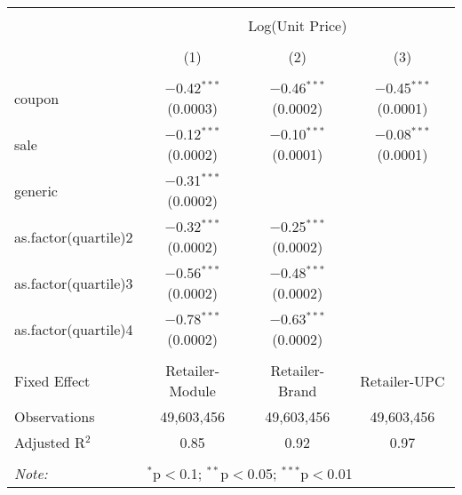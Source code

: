 
\begin{table}[!htbp] \centering 
  \caption{} 
  \label{tab:overallSavings} 
\begin{tabular}{@{\extracolsep{5pt}}lccc} 
\\[-1.8ex]\hline 
\hline \\[-1.8ex] 
 & \multicolumn{3}{c}{Log(Unit Price)} \\ 
\\[-1.8ex] & (1) & (2) & (3)\\ 
\hline \\[-1.8ex] 
 coupon & $-$0.42$^{***}$ (0.0003) & $-$0.46$^{***}$ (0.0002) & $-$0.45$^{***}$ (0.0001) \\ 
  sale & $-$0.12$^{***}$ (0.0002) & $-$0.10$^{***}$ (0.0001) & $-$0.08$^{***}$ (0.0001) \\ 
  generic & $-$0.31$^{***}$ (0.0002) &  &  \\ 
  as.factor(quartile)2 & $-$0.32$^{***}$ (0.0002) & $-$0.25$^{***}$ (0.0002) &  \\ 
  as.factor(quartile)3 & $-$0.56$^{***}$ (0.0002) & $-$0.48$^{***}$ (0.0002) &  \\ 
  as.factor(quartile)4 & $-$0.78$^{***}$ (0.0002) & $-$0.63$^{***}$ (0.0002) &  \\ 
 \hline \\[-1.8ex] 
Fixed Effect & Retailer-Module & Retailer-Brand & Retailer-UPC \\ 
Observations & 49,603,456 & 49,603,456 & 49,603,456 \\ 
Adjusted R$^{2}$ & 0.85 & 0.92 & 0.97 \\ 
\hline 
\hline \\[-1.8ex] 
\textit{Note:}  & \multicolumn{3}{l}{$^{*}$p$<$0.1; $^{**}$p$<$0.05; $^{***}$p$<$0.01} \\ 
\end{tabular} 
\end{table} 

